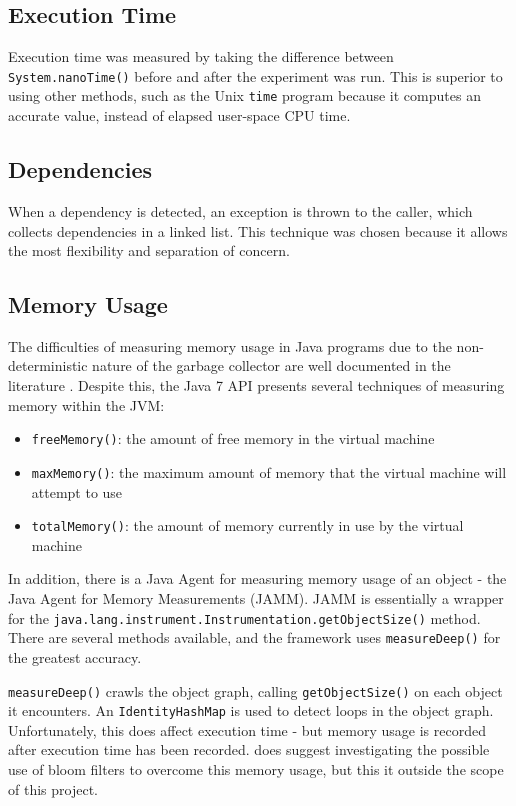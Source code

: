 	\subsection{Execution Time} \label{sec:methodology/measurements/time}
	Execution time was measured by taking the difference between \texttt{System.nanoTime()} before and after the experiment was run. This is superior to using other methods, such as the Unix \texttt{time} program because it computes an accurate value, instead of elapsed user-space CPU time.
	
	\subsection{Dependencies} \label{sec:methodology/measurements/dependencies}
	When a dependency is detected, an exception is thrown to the caller, which collects dependencies in a linked list. This technique was chosen because it allows the most flexibility and separation of concern.
	
	\subsection{Memory Usage} \label{sec:methodology/measurements/memory}
	The difficulties of measuring memory usage in Java programs due to the non-deterministic nature of the garbage collector are well documented in the literature \citep{Kim2000,Ogata2010}. Despite this, the Java 7 API presents several techniques \citep{RuntimeDocs} of measuring memory within the JVM:
	
	\begin{itemize}
		\item \texttt{freeMemory()}: the amount of free memory in the virtual machine
		\item \texttt{maxMemory()}: the maximum amount of memory that the virtual machine will attempt to use
		\item \texttt{totalMemory()}: the amount of memory currently in use by the virtual machine
	\end{itemize}
	
	In addition, there is a Java Agent for measuring memory usage of an object - the Java Agent for Memory Measurements \citep{JAMM} (JAMM). JAMM is essentially a wrapper for the \texttt{java.lang.instrument.Instrumentation.getObjectSize()} method. There are several methods available, and the framework uses \texttt{measureDeep()} for the greatest accuracy.
	
	\texttt{measureDeep()} crawls the object graph, calling \texttt{getObjectSize()} on each object it encounters. An \texttt{IdentityHashMap} is used to detect loops in the object graph. Unfortunately, this does affect execution time - but memory usage is recorded after execution time has been recorded. \citeauthor{JAMM} does suggest investigating the possible use of bloom filters to overcome this memory usage, but this it outside the scope of this project.
	
